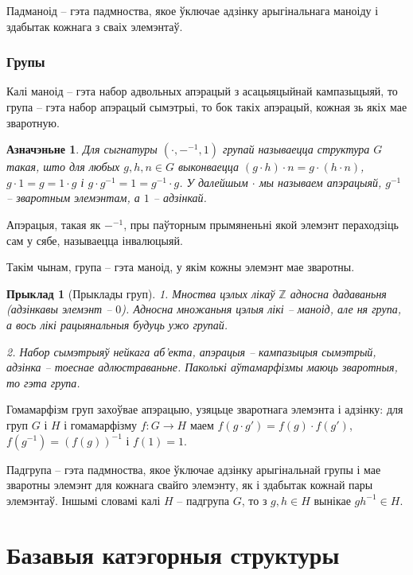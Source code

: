 \documentclass[a4paper,12pt]{book}
\newtheorem{example}{Прыклад}[section]
\newtheorem{definition}{Азначэньне}[section]
\begin{document}
Падманоід -- гэта падмноства, якое ўключае адзінку арыгінальнага
маноіду і здабытак кожнага з сваіх элемэнтаў.

\subsection{Групы}

Калі маноід -- гэта набор адвольных апэрацый з асацыяцыйнай
кампазыцыяй, то група -- гэта набор апэрацый сымэтрыі, то бок такіх
апэрацый, кожная зь якіх мае зваротную.

\begin{definition}
  Для сыгнатуры $(\cdot, -^{-1}, 1)$ групай называецца структура $G$
  такая, што для любых $g, h, n \in G$ выконваецца $(g \cdot h) \cdot n = g
  \cdot (h \cdot n)$, $g \cdot 1 = g = 1 \cdot g$ і $g \cdot g^{-1} =
  1 = g^{-1} \cdot g$. У далейшым $\cdot$ мы называем апэрацыяй,
  $g^{-1}$ -- зваротным элемэнтам, а $1$ -- адзінкай.
\end{definition}

Апэрацыя, такая як $-^{-1}$, пры паўторным прымяненьні якой элемэнт
пераходзіць сам у сябе, называецца інвалюцыяй.

Такім чынам, група -- гэта маноід, у якім кожны элемэнт мае зваротны.

\begin{example}[Прыклады груп]
  1. Мноства цэлых лікаў $\mathbb{Z}$ адносна дадаваньня (адзінкавы
  элемэнт -- $0$). Адносна множаньня цэлыя лікі -- маноід, але ня
  група, а вось лікі рацыянальныя будуць ужо групай.

  2. Набор сымэтрыяў нейкага аб'екта, апэрацыя -- кампазыцыя сымэтрый,
  адзінка -- тоеснае адлюстраваньне. Паколькі аўтамарфізмы маюць
  зваротныя, то гэта група.
\end{example}

Гомамарфізм груп захоўвае апэрацыю, узяцьце зваротнага элемэнта і
адзінку: для груп $G$ і $H$ і гомамарфізму $f:G \rightarrow H$ маем
$f(g \cdot g') = f(g) \cdot
f(g')$, $f(g^{-1}) = (f(g))^{-1}$ і $f(1) = 1$.

Падгрупа -- гэта падмноства, якое ўключае адзінку арыгінальнай
групы і мае зваротны элемэнт для кожнага свайго элемэнту, як і
здабытак кожнай пары элемэнтаў. Іншымі словамі калі $H$ -- падгрупа
$G$, то з $g, h \in H$ вынікае $g h^{-1} \in H$.

\chapter{Базавыя катэгорныя структуры}
\end{document}
